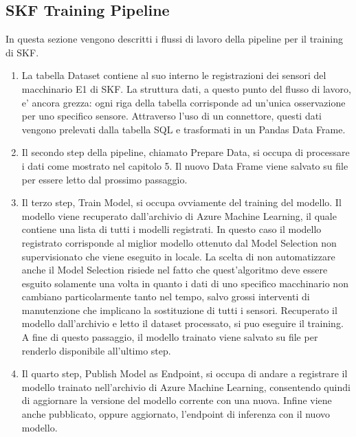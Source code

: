 \subsection{SKF Training Pipeline}
In questa sezione vengono descritti i flussi di lavoro della pipeline per il training di SKF.
\begin{enumerate}
	\item La tabella Dataset contiene al suo interno le registrazioni dei sensori del macchinario E1 di SKF. La struttura dati, a questo punto del flusso di lavoro, e' ancora grezza: ogni riga della tabella corrisponde ad un'unica osservazione per uno specifico sensore. Attraverso l'uso di un connettore, questi dati vengono prelevati dalla tabella SQL e trasformati in un Pandas Data Frame.
	\item Il secondo step della pipeline, chiamato Prepare Data, si occupa di processare i dati come mostrato nel capitolo 5. Il nuovo Data Frame viene salvato su file per essere letto dal prossimo passaggio.
	\item Il terzo step, Train Model, si occupa ovviamente del training del modello. Il modello viene recuperato dall'archivio di Azure Machine Learning, il quale contiene una lista di tutti i modelli registrati. In questo caso il modello registrato corrisponde al miglior modello ottenuto dal Model Selection non supervisionato che viene eseguito in locale. La scelta di non automatizzare anche il Model Selection risiede nel fatto che quest'algoritmo deve essere esguito solamente una volta in quanto i dati di uno specifico macchinario non cambiano particolarmente tanto nel tempo, salvo grossi interventi di manutenzione che implicano la sostituzione di tutti i sensori. Recuperato il modello dall'archivio e letto il dataset processato, si puo eseguire il training. A fine di questo passaggio, il modello trainato viene salvato su file per renderlo disponibile all'ultimo step.
	\item Il quarto step, Publish Model as Endpoint, si occupa di andare a registrare il modello trainato nell'archivio di Azure Machine Learning, consentendo quindi di aggiornare la versione del modello corrente con una nuova. Infine viene anche pubblicato, oppure aggiornato, l'endpoint di inferenza con il nuovo modello.
\end{enumerate}


